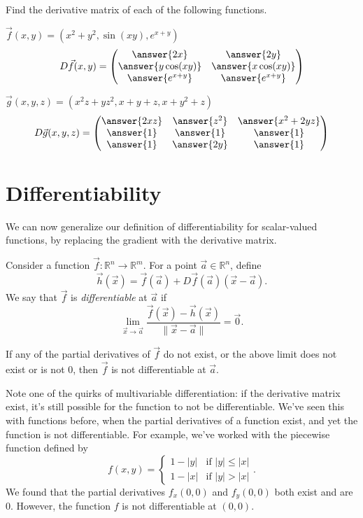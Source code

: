 \documentclass{ximera}
\begin{document}
\begin{problem}
Find the derivative matrix of each of the following functions.

$\vec{f}(x,y) = (x^2+y^2, \sin(xy), e^{x+y})$
\[
D\vec{f}(x,y) =\begin{pmatrix}
\answer{2x} & \answer{2y}\\
\answer{y\cos(xy)} & \answer{x\cos(xy)}\\
\answer{e^{x+y}} & \answer{e^{x+y}}
\end{pmatrix}
\]

$\vec{g}(x,y,z) = (x^2z+yz^2, x+y+z, x+y^2+z)$
\[
D\vec{g}(x,y,z) =\begin{pmatrix}
\answer{2xz} & \answer{z^2} & \answer{x^2+2yz}\\
\answer{1} & \answer{1} & \answer{1}\\
\answer{1} & \answer{2y} & \answer{1}
\end{pmatrix}
\]
\end{problem}

\section*{Differentiability}

We can now generalize our definition of differentiability for scalar-valued functions, by replacing the gradient with the derivative matrix.

\begin{definition}
Consider a function $\vec{f}:\mathbb{R}^n\rightarrow\mathbb{R}^m$. For a point $\vec{a}\in\mathbb{R}^n$, define
\[
\vec{h}(\vec{x}) = \vec{f}(\vec{a})+D\vec{f}(\vec{a})(\vec{x}-\vec{a}).
\]
We say that $\vec{f}$ is \emph{differentiable} at $\vec{a}$ if
\[
\lim_{\vec{x}\rightarrow \vec{a}}\frac{\vec{f}(\vec{x}) - \vec{h}(\vec{x})}{\|\vec{x}-\vec{a}\|} = \vec{0}.
\]

If any of the partial derivatives of $\vec{f}$ do not exist, or the above limit does not exist or is not $0$, then $\vec{f}$ is not differentiable at $\vec{a}$. 
\end{definition}

Note one of the quirks of multivariable differentiation: if the derivative matrix exist, it's still possible for the function to not be differentiable. We've seen this with functions before, when the partial derivatives of a function exist, and yet the function is not differentiable. For example, we've worked with the piecewise function defined by
\[
f(x,y) = \begin{cases} 
      1-|y| & \text{if }|y|\leq |x| \\
      1-|x| & \text{if }|y| > |x|
   \end{cases}.
\]
We found that the partial derivatives $f_x(0,0)$ and $f_y(0,0)$ both exist and are $0$. However, the function $f$ is not differentiable at $(0,0)$.
\end{document}
